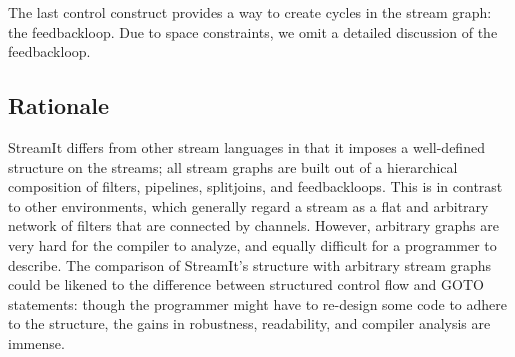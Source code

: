 The last control construct provides a way to create cycles in the
stream graph: the feedbackloop.  Due to space constraints, we omit a
detailed discussion of the feedbackloop.

\subsection{Rationale}

StreamIt differs from other stream languages in that it imposes a
well-defined structure on the streams; all stream graphs are built out
of a hierarchical composition of filters, pipelines, splitjoins, and
feedbackloops.  This is in contrast to other environments, which
generally regard a stream as a flat and arbitrary network of filters
that are connected by channels.  However, arbitrary graphs are very
hard for the compiler to analyze, and equally difficult for a
programmer to describe.  The comparison of StreamIt's structure with
arbitrary stream graphs could be likened to the difference between
structured control flow and GOTO statements: though the programmer
might have to re-design some code to adhere to the structure, the
gains in robustness, readability, and compiler analysis are immense.



